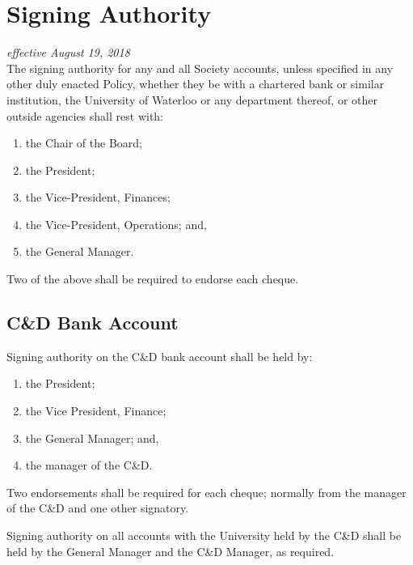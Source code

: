 \section{Signing Authority}
\emph{effective August 19, 2018}\\

The signing authority for any and all Society accounts, unless specified in any
other duly enacted Policy, whether they be with a chartered bank or similar
institution, the University of Waterloo or any department thereof, or other
outside agencies shall rest with:

\begin{enumerate}
    \item the Chair of the Board;
    \item the President;
    \item the Vice-President, Finances;
    \item the Vice-President, Operations; and,
    \item the General Manager.
\end{enumerate}

Two of the above shall be required to endorse each cheque.

\subsection{C\&D Bank Account}
Signing authority on the C\&D bank account shall be held by:

\begin{enumerate}
    \item the President;
    \item the Vice President, Finance; 
    \item the General Manager; and,
    \item the manager of the C\&D. 
\end{enumerate}

Two endorsements shall be required for each cheque; normally from the manager 
of the C\&D and one other signatory. 

Signing authority on all accounts with the University held by the C\&D shall
be held by the General Manager and the C\&D Manager, as required.
